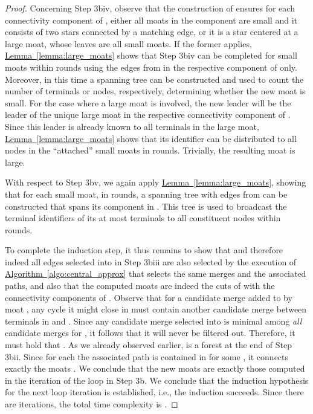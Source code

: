 \documentclass[letterpaper,11pt]{article}
\newcommand{\namedref}[2]{\hyperref[#2]{#1~\ref*{#2}}}
\newcommand{\lemmaref}[1]{\namedref{Lemma}{#1}}
\newcommand{\algref}[1]{\namedref{Algorithm}{#1}}
\begin{document}
\begin{proof}
Concerning Step 3biv, observe that the construction of  ensures for each
connectivity component of , either all moats in the component are
small and it consists of two stars connected by a matching edge, or it is a star
centered at a large moat, whose leaves are all small moats. If the former
applies, \lemmaref{lemma:large_moats} shows that Step 3biv can be completed for
small moats within  rounds using the edges from  in the
respective component of  only. Moreover, in this time a spanning tree can
be constructed and used to count the number of terminals or nodes, respectively,
determining whether the new moat is small. For the case where a large moat is
involved, the new leader will be the leader of the unique large moat in the
respective connectivity component of . Since this leader is already known
to all terminals in the large moat, \lemmaref{lemma:large_moats} shows that its
identifier can be distributed to all nodes in the ``attached'' small moats in
 rounds. Trivially, the resulting moat is large.

With respect to Step 3bv, we again apply \lemmaref{lemma:large_moats}, showing
that for each small moat, in  rounds, a spanning tree with edges
from  can be constructed that spans its component in . This tree is
used to broadcast the terminal identifiers of its at most 
terminals to all constituent nodes within  rounds.

To complete the induction step, it thus remains to show that 
and therefore indeed all edges selected into  in Step 3biii are also selected
by the execution of \algref{algo:central_approx} that selects the same merges
and the associated paths, and also that the computed moats are indeed the cuts
of  with the connectivity components of . Observe that for a candidate
merge added to  by moat , any cycle it might close in  must contain
another candidate merge between terminals in  and . Since any
candidate merge selected into  is minimal among \emph{all} candidate merges
for , it follows that it will never be filtered out. Therefore, it must
hold that . As we already observed earlier,
 is a forest at the end of Step 3bii. Since for each
 the associated path is contained in
 for some , it connects exactly the moats
. We conclude that the new moats are exactly those computed in
the iteration of the loop in Step 3b. We conclude that the induction hypothesis
for the next loop iteration is established, i.e., the induction succeeds. Since
there are  iterations, the total time complexity is
.
\end{proof}
\end{document}
